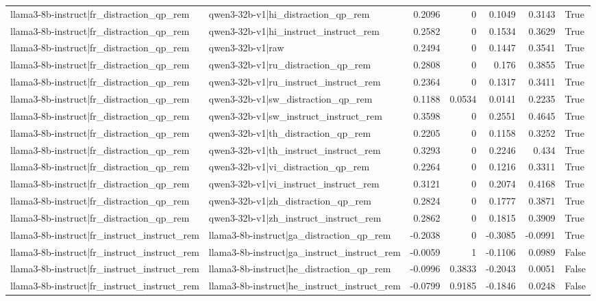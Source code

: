\begin{table}
\begin{tabular}{l l r r r r l}
llama3-8b-instruct|fr_distraction_qp_rem & qwen3-32b-v1|hi_distraction_qp_rem & 0.2096 & 0 & 0.1049 & 0.3143 & True \\
llama3-8b-instruct|fr_distraction_qp_rem & qwen3-32b-v1|hi_instruct_instruct_rem & 0.2582 & 0 & 0.1534 & 0.3629 & True \\
llama3-8b-instruct|fr_distraction_qp_rem & qwen3-32b-v1|raw & 0.2494 & 0 & 0.1447 & 0.3541 & True \\
llama3-8b-instruct|fr_distraction_qp_rem & qwen3-32b-v1|ru_distraction_qp_rem & 0.2808 & 0 & 0.176 & 0.3855 & True \\
llama3-8b-instruct|fr_distraction_qp_rem & qwen3-32b-v1|ru_instruct_instruct_rem & 0.2364 & 0 & 0.1317 & 0.3411 & True \\
llama3-8b-instruct|fr_distraction_qp_rem & qwen3-32b-v1|sw_distraction_qp_rem & 0.1188 & 0.0534 & 0.0141 & 0.2235 & True \\
llama3-8b-instruct|fr_distraction_qp_rem & qwen3-32b-v1|sw_instruct_instruct_rem & 0.3598 & 0 & 0.2551 & 0.4645 & True \\
llama3-8b-instruct|fr_distraction_qp_rem & qwen3-32b-v1|th_distraction_qp_rem & 0.2205 & 0 & 0.1158 & 0.3252 & True \\
llama3-8b-instruct|fr_distraction_qp_rem & qwen3-32b-v1|th_instruct_instruct_rem & 0.3293 & 0 & 0.2246 & 0.434 & True \\
llama3-8b-instruct|fr_distraction_qp_rem & qwen3-32b-v1|vi_distraction_qp_rem & 0.2264 & 0 & 0.1216 & 0.3311 & True \\
llama3-8b-instruct|fr_distraction_qp_rem & qwen3-32b-v1|vi_instruct_instruct_rem & 0.3121 & 0 & 0.2074 & 0.4168 & True \\
llama3-8b-instruct|fr_distraction_qp_rem & qwen3-32b-v1|zh_distraction_qp_rem & 0.2824 & 0 & 0.1777 & 0.3871 & True \\
llama3-8b-instruct|fr_distraction_qp_rem & qwen3-32b-v1|zh_instruct_instruct_rem & 0.2862 & 0 & 0.1815 & 0.3909 & True \\
llama3-8b-instruct|fr_instruct_instruct_rem & llama3-8b-instruct|ga_distraction_qp_rem & -0.2038 & 0 & -0.3085 & -0.0991 & True \\
llama3-8b-instruct|fr_instruct_instruct_rem & llama3-8b-instruct|ga_instruct_instruct_rem & -0.0059 & 1 & -0.1106 & 0.0989 & False \\
llama3-8b-instruct|fr_instruct_instruct_rem & llama3-8b-instruct|he_distraction_qp_rem & -0.0996 & 0.3833 & -0.2043 & 0.0051 & False \\
llama3-8b-instruct|fr_instruct_instruct_rem & llama3-8b-instruct|he_instruct_instruct_rem & -0.0799 & 0.9185 & -0.1846 & 0.0248 & False \\

\end{tabular}
\end{table}
